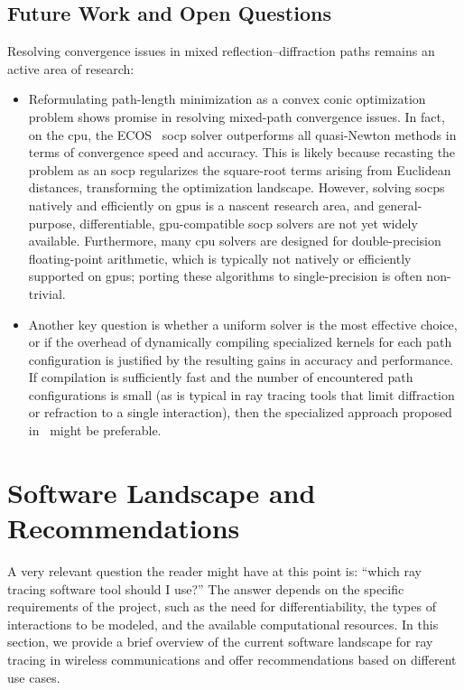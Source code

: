\subsection{Future Work and Open Questions}

Resolving convergence issues in mixed reflection--diffraction paths remains an active area of research:
\begin{itemize}
  \item Reformulating path-length minimization as a convex conic optimization problem shows promise in resolving mixed-path convergence issues. In fact, on the \gls{cpu}, the ECOS~ \gls{socp} solver outperforms all quasi-Newton methods in terms of convergence speed and accuracy. This is likely because recasting the problem as an \gls{socp} regularizes the square-root terms arising from Euclidean distances, transforming the optimization landscape. However, solving \glspl{socp} natively and efficiently on \glspl{gpu} is a nascent research area, and general-purpose, differentiable, \gls{gpu}-compatible \gls{socp} solvers are not yet widely available. Furthermore, many \gls{cpu} solvers are designed for double-precision floating-point arithmetic, which is typically not natively or efficiently supported on \glspl{gpu}; porting these algorithms to single-precision is often non-trivial.
  \item Another key question is whether a uniform solver is the most effective choice, or if the overhead of dynamically compiling specialized kernels for each path configuration is justified by the resulting gains in accuracy and performance. If compilation is sufficiently fast and the number of encountered path configurations is small (as is typical in ray tracing tools that limit diffraction or refraction to a single interaction), then the specialized approach proposed in~ might be preferable.
\end{itemize}

\section{Software Landscape and Recommendations}

A very relevant question the reader might have at this point is: \enquote{which ray tracing software tool should I use?} The answer depends on the specific requirements of the project, such as the need for differentiability, the types of interactions to be modeled, and the available computational resources. In this section, we provide a brief overview of the current software landscape for ray tracing in wireless communications and offer recommendations based on different use cases.

